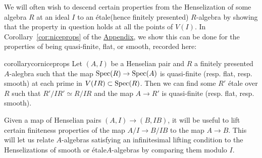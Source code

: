 \documentclass[12pt]{article}
\newcommand{\spec}{{\rm Spec}}
\newcommand{\Et}{\'etale\xspace}
\theoremstyle{definition}
\numberwithin{equation}{subsection}
\begin{document}
We will often wish to descend certain properties from the Henselization of some algebra $R$ at an ideal $I$ to an \Et (hence finitely presented) $R$-algebra by showing that the property in question holds at all the points of $V(I)$. In Corollary~\ref{cor:niceprops} of the \hyperref[sec:appendix]{Appendix}, we show this can be done for the properties of being quasi-finite, flat, or smooth, recorded here:

\begin{restatable*}{corollary}{corniceprops}\label{cor:niceprops}
Let $(A,I)$ be a Henselian pair and $R$ a finitely presented $A$-alegbra such that the map $\spec(R) \to \spec(A)$ is quasi-finite (resp. flat, resp. smooth) at each prime in $V(IR) \subset \spec(R)$. Then we can find some $R'$ \Et over $R$ such that $R'/IR' \simeq R/IR$ and the map $A \to R'$ is quasi-finite (resp. flat, resp. smooth).
\end{restatable*}


Given a map of Henselian pairs $(A,I) \to (B,IB)$, it will be useful to lift certain finiteness properties of the map $A/I \to B/IB$ to the map $A \to B$. This will let us relate $A$-algebras satisfying an infinitesimal lifting condition to the Henselizations of smooth or \Et $A$-algebras by comparing them modulo $I$. 
\end{document}
